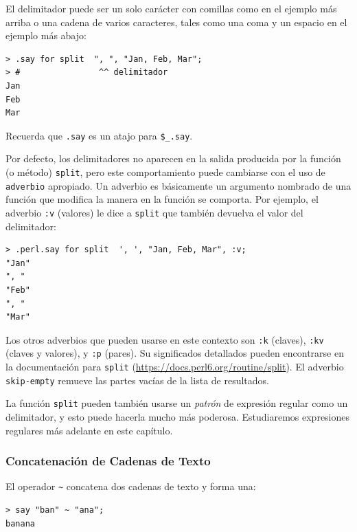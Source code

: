 El delimitador puede ser un solo carácter con comillas como
en el ejemplo más arriba o una cadena de varios caracteres, 
tales como una coma y un espacio en el ejemplo más abajo:

\begin{verbatim}
> .say for split  ", ", "Jan, Feb, Mar";
> #                ^^ delimitador
Jan
Feb
Mar
\end{verbatim}

Recuerda que \verb|.say| es un atajo para \verb|$_.say|.

Por defecto, los delimitadores no aparecen en la salida producida por 
la función (o método) {\tt split}, pero este comportamiento puede 
cambiarse con el uso de {\tt adverbio} apropiado. Un adverbio es básicamente
un argumento nombrado de una función que modifica la manera en la 
función se comporta. Por ejemplo, el adverbio {\tt :v} (valores)
le dice a {\tt split} que también devuelva el valor del delimitador:

\begin{verbatim}
> .perl.say for split  ', ', "Jan, Feb, Mar", :v;
"Jan"
", "
"Feb"
", "
"Mar"
\end{verbatim}

Los otros adverbios que pueden usarse en este contexto son {\tt :k} (claves), 
{\tt :kv} (claves y valores), y {\tt :p} (pares). Su significados detallados pueden
encontrarse en la documentación para {\tt split}
(\url{https://docs.perl6.org/routine/split}). El adverbio {\tt skip-empty}
remueve las partes vacías de la lista de resultados.

La función {\tt split} pueden también usarse un \emph{patrón} 
de expresión regular como un delimitador, y esto puede hacerla
mucho más poderosa. Estudiaremos expresiones regulares más adelante
en este capítulo.

\subsubsection{Concatenación de Cadenas de Texto}


El operador \verb|~| concatena dos cadenas de texto y forma una:

\begin{verbatim}
> say "ban" ~ "ana";
banana
\end{verbatim}
%

